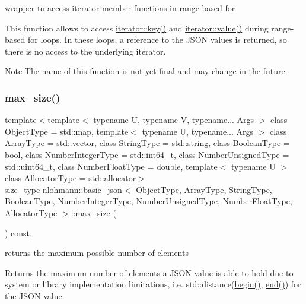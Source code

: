 wrapper to access iterator member functions in range-\/based for 

This function allows to access \hyperlink{classnlohmann_1_1basic__json_1_1const__iterator_a0e717ab658d27f646a3c8602cac91d83}{iterator\+::key()} and \hyperlink{classnlohmann_1_1basic__json_1_1iterator_ac688806417f3b4e17c4eb1b661b522f1}{iterator\+::value()} during range-\/based for loops. In these loops, a reference to the J\+S\+ON values is returned, so there is no access to the underlying iterator.

\begin{DoxyNote}{Note}
The name of this function is not yet final and may change in the future. 
\end{DoxyNote}
\hypertarget{classnlohmann_1_1basic__json_a7936417b875b7ec737f77ef84bbf7871}{}\label{classnlohmann_1_1basic__json_a7936417b875b7ec737f77ef84bbf7871} 
\subsubsection{\texorpdfstring{max\+\_\+size()}{max\_size()}}
{\footnotesize\ttfamily template$<$template$<$ typename U, typename V, typename... Args $>$ class Object\+Type = std\+::map, template$<$ typename U, typename... Args $>$ class Array\+Type = std\+::vector, class String\+Type  = std\+::string, class Boolean\+Type  = bool, class Number\+Integer\+Type  = std\+::int64\+\_\+t, class Number\+Unsigned\+Type  = std\+::uint64\+\_\+t, class Number\+Float\+Type  = double, template$<$ typename U $>$ class Allocator\+Type = std\+::allocator$>$ \\
\hyperlink{classnlohmann_1_1basic__json_a1579a8f72a230358d6cd1a6e8a62859b}{size\+\_\+type} \hyperlink{classnlohmann_1_1basic__json}{nlohmann\+::basic\+\_\+json}$<$ Object\+Type, Array\+Type, String\+Type, Boolean\+Type, Number\+Integer\+Type, Number\+Unsigned\+Type, Number\+Float\+Type, Allocator\+Type $>$\+::max\+\_\+size (\begin{DoxyParamCaption}{ }\end{DoxyParamCaption}) const\hspace{0.3cm}{\ttfamily [inline]}, {\ttfamily [noexcept]}}



returns the maximum possible number of elements 

Returns the maximum number of elements a J\+S\+ON value is able to hold due to system or library implementation limitations, i.\+e. {\ttfamily std\+::distance(\hyperlink{classnlohmann_1_1basic__json_ad4e381c54039607be08d7af41a1f6ad1}{begin()}, \hyperlink{classnlohmann_1_1basic__json_a12ccf14d39ddae52f6c7e126105a230b}{end()})} for the J\+S\+ON value.

